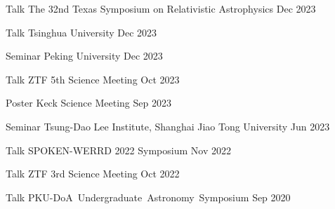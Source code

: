 


\begin{cventries}
	
	\cvsimpentry
	{Talk}
	{The 32nd Texas Symposium on Relativistic Astrophysics}
	{Dec 2023}
	{}

	\cvsimpentry
	{Talk}
	{Tsinghua University}
	{Dec 2023}
	{}

	\cvsimpentry
	{Seminar}
	{Peking University}
	{Dec 2023}
	{}

	\cvsimpentry
	{Talk}
	{ZTF 5th Science Meeting}
	{Oct 2023}
	{}
	
	\cvsimpentry
	{Poster}
	{Keck Science Meeting}
	{Sep 2023}
	{}

	\cvsimpentry
	{Seminar}
	{Tsung-Dao Lee Institute, Shanghai Jiao Tong University}
	{Jun 2023}
	{}

	\cvsimpentry
	{Talk}
	{SPOKEN-WERRD 2022 Symposium} %
	{Nov 2022} %
	{}

	\cvsimpentry
	{Talk} %
	{ZTF 3rd Science Meeting} %
	{Oct 2022} %
	{}
	
	\cvsimpentry
	{Talk} %
	{PKU-DoA Undergraduate Astronomy Symposium} %
	{Sep 2020} %
	{}

\end{cventries}